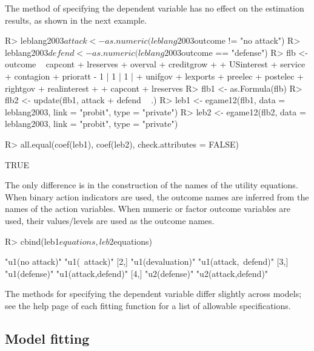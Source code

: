 \documentclass[article]{jss}
\begin{document}
The method of specifying the dependent variable has no effect on the estimation
results, as shown in the next example.
\begin{Schunk}
\begin{Sinput}
R> leblang2003$attack <- as.numeric(leblang2003$outcome != "no attack")
R> leblang2003$defend <- as.numeric(leblang2003$outcome == "defense")
R> flb <- outcome ~ capcont + lreserves + overval + creditgrow + 
+     USinterest + service + contagion + prioratt - 1 | 1 | 1 | 
+     unifgov + lexports + preelec + postelec + rightgov + realinterest + 
+         capcont + lreserves
R> flb1 <- as.Formula(flb)
R> flb2 <- update(flb1, attack + defend ~ .)
R> leb1 <- egame12(flb1, data = leblang2003, link = "probit", type = "private")
R> leb2 <- egame12(flb2, data = leblang2003, link = "probit", type = "private")
\end{Sinput}
\end{Schunk}
\begin{Schunk}
\begin{Sinput}
R> all.equal(coef(leb1), coef(leb2), check.attributes = FALSE)
\end{Sinput}
\begin{Soutput}
[1] TRUE
\end{Soutput}
\end{Schunk}
The only difference is in the construction of the names of the utility
equations.  When binary action indicators are used, the outcome names are
inferred from the names of the action variables.  When numeric or factor outcome
variables are used, their values/levels are used as the outcome names.
\begin{Schunk}
\begin{Sinput}
R> cbind(leb1$equations, leb2$equations)
\end{Sinput}
\begin{Soutput}
     [,1]              [,2]                
[1,] "u1(no attack)"   "u1(~attack)"       
[2,] "u1(devaluation)" "u1(attack,~defend)"
[3,] "u1(defense)"     "u1(attack,defend)" 
[4,] "u2(defense)"     "u2(attack,defend)" 
\end{Soutput}
\end{Schunk}
The methods for specifying the dependent variable differ slightly
across models; see the help page of each fitting function for a list of
allowable specifications.

\subsection{Model fitting}
\label{sec:fitting}
\end{document}
